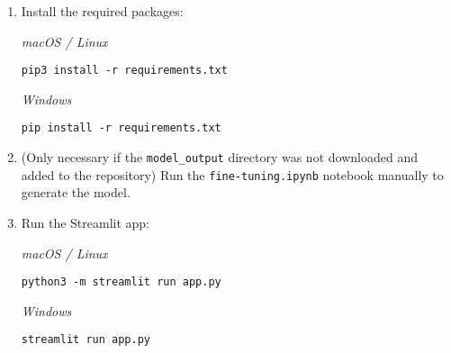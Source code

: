 \begin{enumerate}
    \begin{tcolorbox}[colback=gray!10, colframe=gray!50, breakable, boxrule=0.4pt, sharp corners]
\begin{verbatim}
python -m venv venv
.\venv\Scripts\Activate.ps1
\end{verbatim}
    \end{tcolorbox}
    
    \item Install the required packages:
    
    \textit{macOS / Linux}
    
    \begin{tcolorbox}[colback=gray!10, colframe=gray!50, breakable, boxrule=0.4pt, sharp corners]
\begin{verbatim}
pip3 install -r requirements.txt
\end{verbatim}
    \end{tcolorbox}
    
    \textit{Windows}
    
    \begin{tcolorbox}[colback=gray!10, colframe=gray!50, breakable, boxrule=0.4pt, sharp corners]
\begin{verbatim}
pip install -r requirements.txt
\end{verbatim}
    \end{tcolorbox}
    
    \item (Only necessary if the \texttt{model\_output} directory was not downloaded and added to the repository) Run the \texttt{fine-tuning.ipynb} notebook manually to generate the model.

    \item Run the Streamlit app:
    
    \textit{macOS / Linux}
    
    \begin{tcolorbox}[colback=gray!10, colframe=gray!50, breakable, boxrule=0.4pt, sharp corners]
\begin{verbatim}
python3 -m streamlit run app.py
\end{verbatim}
    \end{tcolorbox}
    
    \textit{Windows}
    
    \begin{tcolorbox}[colback=gray!10, colframe=gray!50, breakable, boxrule=0.4pt, sharp corners]
\begin{verbatim}
streamlit run app.py
\end{verbatim}
    \end{tcolorbox}
\end{enumerate}
